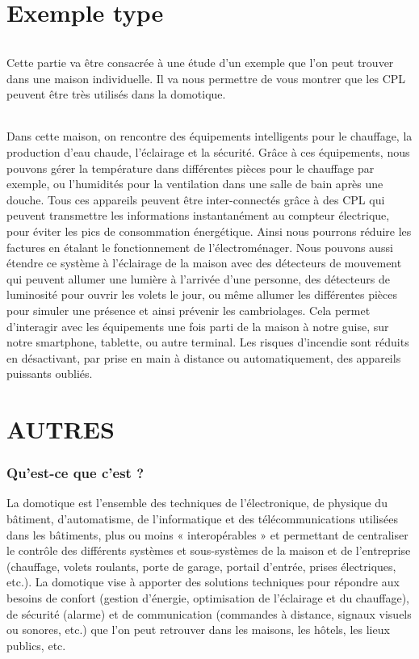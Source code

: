 \part{Exemple type}
            \paragraph{}
Cette partie va être consacrée à une étude d’un exemple que l’on peut trouver dans une maison individuelle.
Il va nous permettre de vous montrer que les CPL peuvent être très utilisés dans la domotique.
            \paragraph{}
Dans cette maison, on rencontre des équipements intelligents pour le chauffage, la production d’eau chaude, l’éclairage et la sécurité.
Grâce à ces équipements, nous pouvons gérer la température dans différentes pièces pour le chauffage par exemple, ou l'humidités pour la ventilation dans une salle de bain après une douche.
Tous ces appareils peuvent être inter-connectés grâce à des CPL qui peuvent transmettre les informations instantanément au compteur électrique, pour éviter les pics de consommation énergétique.
Ainsi nous pourrons réduire les factures en étalant le fonctionnement de l'électroménager.
Nous pouvons aussi étendre ce système à l’éclairage de la maison avec des détecteurs de mouvement qui peuvent allumer une lumière à l’arrivée d’une personne,
des détecteurs de luminosité pour ouvrir les volets le jour, ou même allumer les différentes pièces pour simuler une présence et ainsi prévenir les cambriolages.
Cela permet d'interagir avec les équipements une fois parti de la maison à notre guise, sur notre smartphone, tablette, ou autre terminal.
Les risques d’incendie sont réduits en désactivant, par prise en main à distance ou automatiquement, des appareils puissants oubliés.








\part{AUTRES}
        \section{Qu’est-ce que c’est ?}
La domotique est l’ensemble des techniques de l'électronique, de physique du bâtiment, d'automatisme, de l'informatique et des télécommunications utilisées dans les bâtiments, plus ou moins « interopérables » et permettant de centraliser le contrôle des différents systèmes et sous-systèmes de la maison et de l'entreprise (chauffage, volets roulants, porte de garage, portail d'entrée, prises électriques, etc.).
La domotique vise à apporter des solutions techniques pour répondre aux besoins de confort (gestion d'énergie, optimisation de l'éclairage et du chauffage), de sécurité (alarme) et de communication (commandes à distance, signaux visuels ou sonores, etc.) que l'on peut retrouver dans les maisons, les hôtels, les lieux publics, etc.

